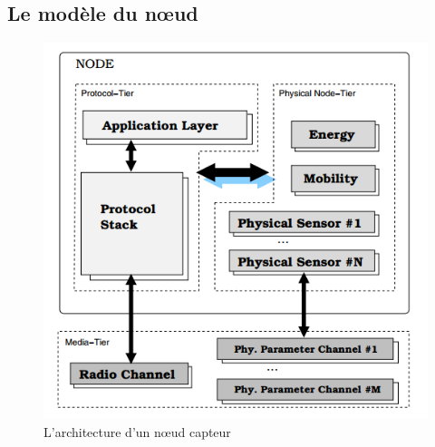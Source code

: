 \subsection{Le modèle du nœud}

\begin{figure}[!h]

\includegraphics[scale=0.7]{nodeModel}
\caption{\label{nodeModel} L'architecture d'un nœud capteur}
\end{figure}

